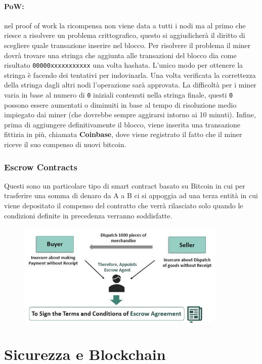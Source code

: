 \paragraph{PoW:}
nel proof of work la ricompensa non viene data a tutti i nodi ma al primo che
riesce a risolvere un problema crittografico, questo si aggiudicherà il diritto
di scegliere quale transazione inserire nel blocco. Per risolvere il problema il
miner dovrà trovare una stringa che aggiunta alle transazioni del blocco dia
come risultato \verb|00000xxxxxxxxxxx| una volta hashata. L'unico modo per
ottenere la stringa è facendo dei tentativi per indovinarla. Una volta
verificata la correttezza della stringa dagli altri nodi l'operazione sarà
approvata. La difficoltà per i miner varia in base al numero di \verb|0|
iniziali contenuti nella stringa finale, questi \verb|0| possono essere
aumentati o diminuiti in base al tempo di risoluzione medio impiegato dai miner
(che dovrebbe sempre aggirarsi intorno ai 10 minuti). Infine, prima di
aggiungere definitivamente il blocco, viene inserita una transazione fittizia in
più, chiamata \textbf{Coinbase}, dove viene registrato il fatto che il miner riceve
il suo compenso di nuovi bitcoin.

\subsubsection{Escrow Contracts}

Questi sono un particolare tipo di smart contract basato su Bitcoin in cui per
trasferire una somma di denaro da A a B ci si appoggia ad una terza entità in
cui viene depositato il compenso del contratto che verrà rilasciato solo quando
le condizioni definite in precedenza verranno soddisfatte.

\begin{figure}[H]
    \centering
    \includegraphics[width=10cm, keepaspectratio]{capitoli/bitcoin/imgs/escort.png}
\end{figure}


\section{Sicurezza e Blockchain}

